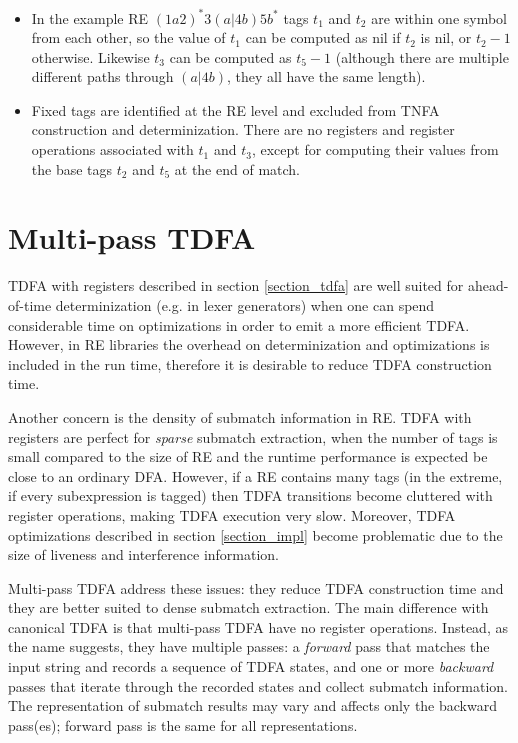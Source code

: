 \documentclass[]{article}
\begin{document}
\begin{itemize}

\item[\ding{212}]
In the example RE $(1a2)^*3(a|4b)5b^*$ tags $t_1$ and $t_2$ are within one symbol from each other,
so the value of $t_1$ can be computed as nil if $t_2$ is nil, or $t_2 - 1$ otherwise.
Likewise $t_3$ can be computed as $t_5 - 1$ (although there are multiple different paths through $(a|4b)$, they all have the same length).
\medskip

\item[\ding{212}]
Fixed tags are identified at the RE level and excluded from TNFA construction and determinization.
There are no registers and register operations associated with $t_1$ and $t_3$,
except for computing their values from the base tags $t_2$ and $t_5$ at the end of match.
\medskip

\end{itemize}

\FloatBarrier

\section{Multi-pass TDFA}\label{section_multipass}

TDFA with registers described in section \ref{section_tdfa}
are well suited for ahead-of-time determinization (e.g. in lexer generators)
when one can spend considerable time on optimizations in order to emit a more efficient TDFA.
However, in RE libraries the overhead on determinization and optimizations is included in the run time,
therefore it is desirable to reduce TDFA construction time.
\medskip

Another concern is the density of submatch information in RE.
TDFA with registers are perfect for \emph{sparse} submatch extraction,
when the number of tags is small compared to the size of RE
and the runtime performance is expected be close to an ordinary DFA.
However, if a RE contains many tags (in the extreme, if every subexpression is tagged)
then TDFA transitions become cluttered with register operations,
making TDFA execution very slow.
Moreover, TDFA optimizations described in section \ref{section_impl} become problematic
due to the size of liveness and interference information.
\medskip

Multi-pass TDFA address these issues:
they reduce TDFA construction time and they are better suited to dense submatch extraction.
The main difference with canonical TDFA is that multi-pass TDFA have no register operations.
Instead, as the name suggests, they have multiple passes:
a \emph{forward} pass that matches the input string and records a sequence of TDFA states,
and one or more \emph{backward} passes that iterate through the recorded states and collect submatch information.
The representation of submatch results may vary and affects only the backward pass(es);
forward pass is the same for all representations.
\medskip
\end{document}
